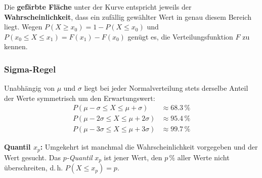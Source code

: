 \vspace{2pt}
\noindent
Die \textbf{gefärbte Fläche} unter der Kurve entspricht jeweils der \textbf{Wahrscheinlichkeit}, dass ein zufällig gewählter Wert in genau diesem Bereich liegt. Wegen $P(X \geq x_0) = 1 - P(X \leq x_0)$ und $P(x_0 \leq X \leq x_1) = F(x_1) - F(x_0)$ genügt es, die Verteilungsfunktion $F$ zu kennen.

\subsubsection*{Sigma-Regel}
Unabhängig von $\mu$ und $\sigma$ liegt bei jeder Normalverteilung stets derselbe Anteil der Werte symmetrisch um den Erwartungswert:
\begin{align}
    P(\mu-\sigma \leq X \leq \mu+\sigma)   &\approx 68.3\,\% \\
    P(\mu-2\sigma \leq X \leq \mu+2\sigma) &\approx 95.4\,\% \\
    P(\mu-3\sigma \leq X \leq \mu+3\sigma) &\approx 99.7\,\%
\end{align}
\begin{center}
\end{center}

\noindent\textbf{Quantil $x_p$:} Umgekehrt ist manchmal die Wahrscheinlichkeit vorgegeben und der Wert gesucht. Das \emph{$p$-Quantil} $x_p$ ist jener Wert, den $p\,\%$ aller Werte nicht überschreiten, d.\,h. $P(X \leq x_p) = p$.


